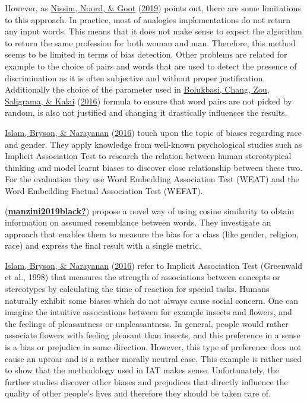 \documentclass[
  12pt,
]{book}
\begin{document}
However, as \protect\hyperlink{ref-Nissim2019Fair}{Nissim, Noord, \& Goot} (\protect\hyperlink{ref-Nissim2019Fair}{2019}) points out, there are some limitations to this approach. In practice, most of analogies implementations do not return any input words. This means that it does not make sense to expect the algorithm to return the same profession for both woman and man. Therefore, this method seems to be limited in terms of bias detection. Other problems are related for example to the choice of pairs and words that are used to detect the presence of discrimination as it is often subjective and without proper justification. Additionally the choice of the parameter used in \protect\hyperlink{ref-Bolukbasi2016Man}{Bolukbasi, Chang, Zou, Saligrama, \& Kalai} (\protect\hyperlink{ref-Bolukbasi2016Man}{2016}) formula to ensure that word pairs are not picked by random, is also not justified and changing it drastically
influences the results.

\protect\hyperlink{ref-Caliskan2017Semantics}{Islam, Bryson, \& Narayanan} (\protect\hyperlink{ref-Caliskan2017Semantics}{2016}) touch upon the topic of biases regarding race and gender. They apply knowledge from well-known psychological studies such as Implicit Association Test to research the relation between human stereotypical thinking and model learnt biases to
discover close relationship between these two. For the evaluation they use Word Embedding Association Test (WEAT) and the Word Embedding Factual Association Test (WEFAT).

(\protect\hyperlink{ref-manzini2019black}{\textbf{manzini2019black?}}) propose a novel way of using cosine similarity to obtain information on assumed resemblance between words. They investigate
an approach that enables them to measure the bias for a class (like gender, religion, race) and express the final result with a single metric.

\protect\hyperlink{ref-Caliskan2017Semantics}{Islam, Bryson, \& Narayanan} (\protect\hyperlink{ref-Caliskan2017Semantics}{2016}) refer to Implicit Association Test (Greenwald et al., 1998) that measures the strength of associations between concepts or stereotypes by calculating the time of reaction for special tasks. Humans naturally exhibit some biases which do not always cause social concern. One can imagine the intuitive associations between for example insects and flowers, and the feelings of pleasantness or unpleasantness. In general, people would rather associate flowers with feeling pleasant than insects, and this preference in a sense is a bias or
prejudice in some direction. However, this type of preference does not cause an uproar and is a rather morally neutral case. This example is rather used to show that the methodology used in IAT makes sense. Unfortunately, the further studies discover other biases and prejudices that directly influence the quality of other people's lives and therefore they should be taken care of.
\end{document}
